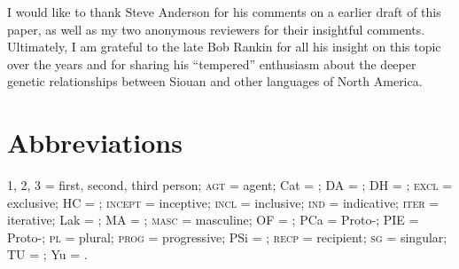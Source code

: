 \documentclass[output=paper]{LSP/langsci}
\begin{document}
I would like to thank Steve Anderson for his comments on a earlier draft of this paper, as well as my two anonymous reviewers for their insightful comments. Ultimately, I am grateful to the late Bob Rankin for all his insight on this topic over the years and for sharing his ``tempered'' enthusiasm about the deeper genetic relationships between Siouan and other languages of North America.

\section*{Abbreviations}
1, 2, 3 = first, second, third person; \textsc{agt} = agent; Cat = ; DA = ; DH = ; \textsc{excl} = exclusive; HC = ; \textsc{incept} = inceptive; \textsc{incl} = inclusive; \textsc{ind} = indicative; \textsc{iter} = iterative; Lak = ; MA = ; \textsc{masc} = masculine; OF = ; PCa = Proto-; PIE = Proto-; \textsc{pl} = plural; \textsc{prog} = progressive; PSi = ; \textsc{recp} = recipient; \textsc{sg} = singular; TU = ; Yu = .

\nocite{CrawfordNotebooks,Crawford1979}

\printbibliography[heading=subbibliography,notkeyword=this]
 
\end{document}
